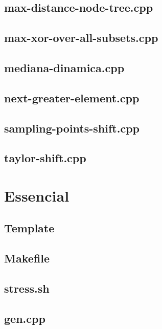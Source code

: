 \documentclass[a4paper,12pt]{article}
\begin{document}
\subsection{max-distance-node-tree.cpp}


\subsection{max-xor-over-all-subsets.cpp}


\subsection{mediana-dinamica.cpp}


\subsection{next-greater-element.cpp}


\subsection{sampling-points-shift.cpp}


\subsection{taylor-shift.cpp}


\pagebreak

\section{Essencial}

\subsection{Template}



\subsection{Makefile}


\pagebreak
\subsection{stress.sh}


\subsection{gen.cpp}

\end{document}
